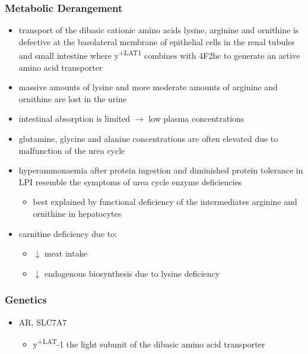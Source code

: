 \documentclass{scrartcl}
\begin{document}
\subsubsection{Metabolic Derangement}
\label{sec:orgf4250c0}
\begin{itemize}
\item transport of the dibasic cationic amino acids lysine, arginine and
ornithine is defective at the basolateral membrane of epithelial
cells in the renal tubules and small intestine where y\textsuperscript{+LAT1}
combines with 4F2hc to generate an active amino acid transporter
\item massive amounts of lysine and more moderate amounts of arginine and
ornithine are lost in the urine
\item intestinal absorption is limited \(\to\) low plasma concentrations
\item glutamine, glycine and alanine concentrations are often elevated due
to malfunction of the urea cycle
\item hyperammonaemia after protein ingestion and diminished protein
tolerance in LPI resemble the symptoms of urea cycle enzyme
deficiencies
\begin{itemize}
\item best explained by functional deficiency of the intermediates
arginine and ornithine in hepatocytes
\end{itemize}
\item carnitine deficiency due to:
\begin{itemize}
\item \(\downarrow\) meat intake
\item \(\downarrow\) endogenous biosynthesis due to lysine deficiency
\end{itemize}
\end{itemize}

\subsubsection{Genetics}
\label{sec:orgb4e1249}
\begin{itemize}
\item AR, SLC7A7
\begin{itemize}
\item y\textsuperscript{+LAT}-1 the light subunit of the dibasic amino acid
transporter
\end{itemize}
\end{itemize}
\end{document}
